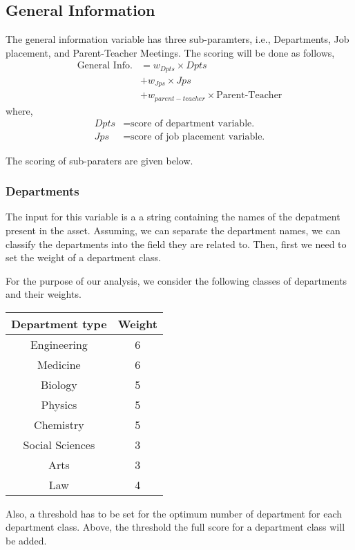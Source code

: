 \documentclass[oneside,twocolumn]{article}
\begin{document}
\subsection{General Information}
The general information variable has three sub-paramters, i.e.,
Departments, Job placement, and Parent-Teacher Meetings. The scoring will be
done as follows,
\begin{align*}
	\text{General Info.} &= w_{Dpts} \times Dpts \\
	   &+ w_{Jps} \times Jps \\
	   &+ w_{parent-teacher} \times \text{Parent-Teacher}
\end{align*}
where,
\begin{align*}
	Dpts &= \text{score of department variable.} \\
	Jps &= \text{score of job placement variable.}
\end{align*}

The scoring of sub-paraters are given below.

\subsubsection{Departments}
The input for this variable is a a string containing the
names of the depatment present in the asset. Assuming, we
can separate the department names, we can classify the
departments into the field they are related to. Then, first
we need to set the weight of a department class.

For the purpose of our analysis, we consider the following
classes of departments and their weights.
\begin{center}
  \begin{tabular}{c|c}
    \hline
    Department type & Weight \\ \hline
    Engineering     & 6 \\
    Medicine        & 6 \\
    Biology         & 5 \\
    Physics         & 5 \\
    Chemistry       & 5 \\
    Social Sciences & 3 \\
    Arts            & 3 \\
    Law             & 4 \\ \hline
  \end{tabular}
\end{center}

Also, a threshold has to be set for the optimum number of
department for each department class. Above, the threshold
the full score for a department class will be added.
\end{document}
